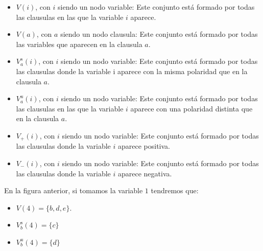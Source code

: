 \begin{itemize}
	\item $V(i)$, con $i$ siendo un nodo variable: Este conjunto está formado por todas las clausulas en las que la variable $i$ aparece.
	\item $V(a)$, con $a$ siendo un nodo clausula: Este conjunto está formado por todas las variables que aparecen en la clausula $a$.
	\item $V_a^s (i)$, con $i$ siendo un nodo variable: Este conjunto está formado por todas las clausulas donde la variable i aparece con la misma polaridad que en la clausula $a$.
	\item $V_{a}^u (i)$, con $i$ siendo un nodo variable: Este conjunto está formado por todas las clausulas en las que la variable $i$ aparece con una polaridad distinta que en la clausula $a$.
	\item $V_{+} (i)$, con $i$ siendo un nodo variable: Este conjunto está formado por todas las clausulas donde la variable $i$ aparece positiva.
	\item $V_{-} (i)$, con $i$ siendo un nodo variable: Este conjunto está formado por todas las clausulas donde la variable $i$ aparece negativa. 
\end{itemize}
En la figura anterior, si tomamos la variable $1$ tendremos que: 
\begin{itemize}
	\item $V(4) = \{b, d, e\}$.
	\item $V_{b}^s (4) = \{c\}$
	\item $V_{b}^u (4) = \{d\}$
\end{itemize}